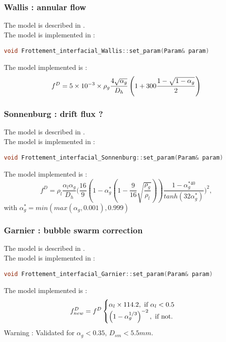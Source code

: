 \subsubsection{Wallis : annular flow}
The model is described in \textcite{wallis}.\\
The model is implemented in :
\begin{lstlisting}[language=c++]
void Frottement_interfacial_Wallis::set_param(Param& param)
\end{lstlisting}
The model implemented is :
\begin{equation}
   f^{D}=\num{5e-3}\times{}\rho_g\frac{4\sqrt{\alpha_g}}{D_h}\left( 1+300\frac{1-\sqrt{1-\alpha_g}}{2} \right)
\end{equation}

\subsubsection{Sonnenburg : drift flux ?}
The model is described in .\\
The model is implemented in :
\begin{lstlisting}[language=c++]
void Frottement_interfacial_Sonnenburg::set_param(Param& param)
\end{lstlisting}
The model implemented is :
\begin{equation}
   f^{D}=\rho_l\frac{\alpha_l\alpha_g}{D_h}\Big(\frac{16}{9}(1-\alpha_g^*(1-\frac{9}{16}\sqrt{\frac{\rho_g}{\rho_l}}))\frac{1-\alpha_g^{*40}}{tanh(32\alpha_g^*)}\Big)^2,
\end{equation}
with $\alpha_g^*=min(max(\alpha_g,0.001),0.999)$

\subsubsection{Garnier : bubble swarm correction}
The model is described in \textcite{GARNIER2002811}.\\
The model is implemented in :
\begin{lstlisting}[language=c++]
void Frottement_interfacial_Garnier::set_param(Param& param)
\end{lstlisting}
The model implemented is :
\begin{equation}
   f^{D}_{new}=f^{D}\begin{cases} \alpha_l\times 114.2,\text{ if }\alpha_l< 0.5  \\
          \left( 1-\alpha_g^{1/3} \right)^{-2},\text{ if not}.
   \end{cases}
\end{equation}
{\color{red} Warning} : Validated for $\alpha_g  < 0.35$, $D_{sm} < 5.5mm$.

